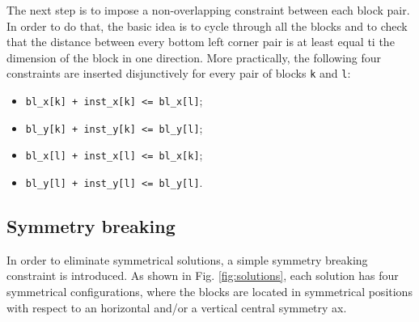 \documentclass[a4paper, 12pt]{article}
\begin{document}
The next step is to impose a non-overlapping constraint between each block pair. In order to do that, the basic idea is to cycle through all the blocks and to check that the distance between every bottom left corner pair is at least equal ti the dimension of the block in one direction. More practically, the following four constraints are inserted disjunctively for every pair of blocks \verb|k| and \verb|l|:
\begin{itemize}
	\item \verb|bl_x[k] + inst_x[k] <= bl_x[l]|;
	\item \verb|bl_y[k] + inst_y[k] <= bl_y[l]|;
	\item \verb|bl_x[l] + inst_x[l] <= bl_x[k]|;
	\item \verb|bl_y[l] + inst_y[l] <= bl_y[l]|.
\end{itemize}


\subsection{Symmetry breaking}\label{sec:symmetry}

In order to eliminate symmetrical solutions, a simple symmetry breaking constraint is introduced. As shown in Fig. \ref{fig:solutions}, each solution has four symmetrical configurations, where the blocks are located in symmetrical positions with respect to an horizontal and/or a vertical central symmetry ax.
\end{document}
